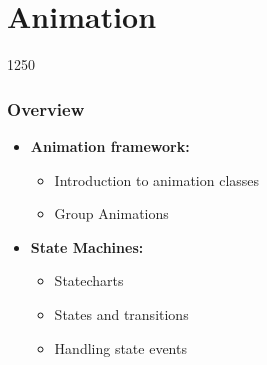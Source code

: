 %
%
%
%

\section{Animation}

\begin{slide}{1250}
\label{animation-communication}
\frametitle{Overview}

\begin{itemize}
\item \textbf{Animation framework:}
\begin{itemize}
\item Introduction to animation classes
\item Group Animations
\end{itemize}
\item \textbf{State Machines:}
\begin{itemize}
\item Statecharts
\item States and transitions
\item Handling state events
\end{itemize}
\end{itemize}

\end{slide}




